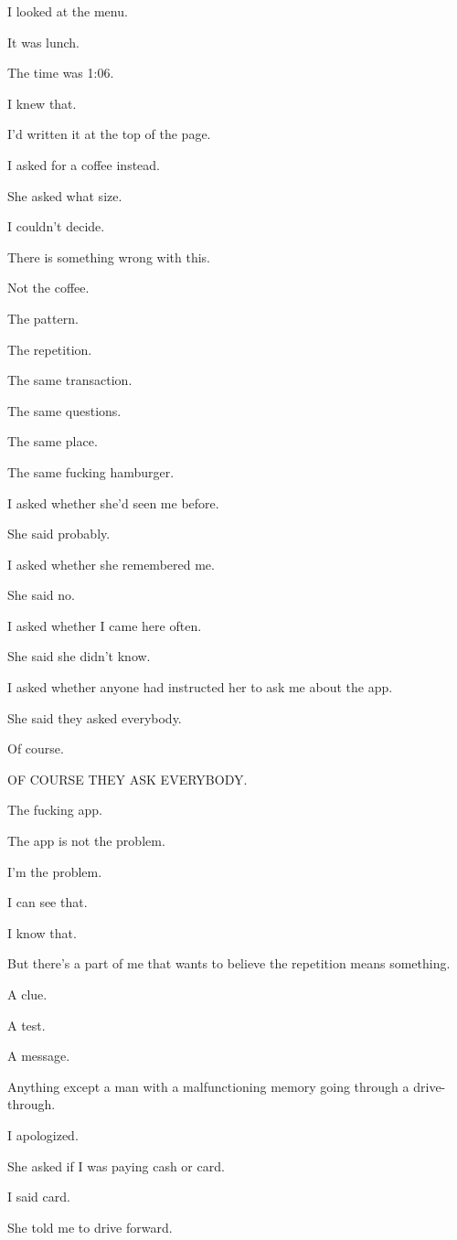 \documentclass[11pt,oneside]{book}
\begin{document}
I looked at the menu.

It was lunch.

The time was 1:06.

I knew that.

I'd written it at the top of the page.

I asked for a coffee instead.

She asked what size.

I couldn't decide.

There is something wrong with this.

Not the coffee.

The pattern.

The repetition.

The same transaction.

The same questions.

The same place.

The same fucking hamburger.

I asked whether she'd seen me before.

She said probably.

I asked whether she remembered me.

She said no.

I asked whether I came here often.

She said she didn't know.

I asked whether anyone had instructed her to ask me about the app.

She said they asked everybody.

Of course.

OF COURSE THEY ASK EVERYBODY.

The fucking app.

The app is not the problem.

I'm the problem.

I can see that.

I know that.

But there's a part of me that wants to believe the repetition means something.

A clue.

A test.

A message.

Anything except a man with a malfunctioning memory going through a drive-through.

I apologized.

She asked if I was paying cash or card.

I said card.

She told me to drive forward.
\end{document}
